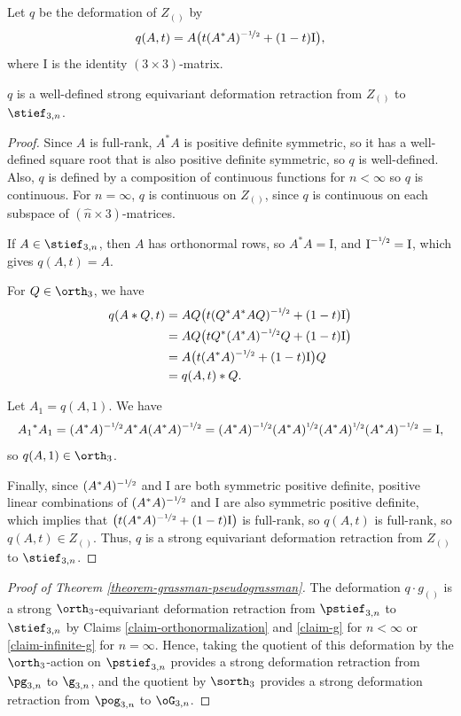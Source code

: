 \newcommand{\I}{\text{I}}

Let $q$ be the deformation of $Z_{()}$ by\vspace*{-3pt}
\[ q(A,t) = A \bigl(t(A^*A)^{-\nicefrac{1}{2}}+(1-t)\I\bigr), \]
where $\I$ is the identity $(3\times 3)$-matrix.

\begin{claim}\label{claim-orthonormalization}
$q$ is a well-defined strong equivariant deformation retraction from $Z_{()}$ to $\stief_{3,n}$.
\end{claim}

\begin{proof}
Since $A$ is full-rank, $A^*A$ is positive definite symmetric, so it has a well-defined square root that is also positive definite symmetric, so $q$ is well-defined. Also, $q$ is defined by a composition of continuous functions for $n < \infty$ so $q$ is continuous. For $n=\infty$, $q$ is continuous on $Z_{()}$, since $q$ is continuous on each subspace of $(\hat n\times 3)$-matrices.

If $A \in \stief_{3,n}$, then $A$ has orthonormal rows, so $A^*A = \I$, and $\I^{-\nicefrac{1}{2}} = \I$, which gives $q(A,t) = A$.

For $Q \in \orth_3$, we have\vspace*{-3pt}
\begin{align*}
q(A*Q,t)&= AQ \bigl(t(Q^*A^*AQ)^{-\nicefrac{1}{2}}+(1-t)\I \bigr) \\
&= AQ \bigl(tQ^*(A^*A)^{-\nicefrac{1}{2}}Q+(1-t)\I \bigr) \\
&= A \bigl(t(A^*A)^{-\nicefrac{1}{2}}+(1-t)\I \bigr) Q \\
&= q(A,t)*Q.
\end{align*}

Let $A_1 = q(A,1)$. We have
\[ A_1{}^* A_1
= (A^*A)^{-\nicefrac{1}{2}} A^* A (A^*A)^{-\nicefrac{1}{2}}
= (A^*A)^{-\nicefrac{1}{2}} (A^* A)^{\nicefrac{1}{2}} (A^* A)^{\nicefrac{1}{2}} (A^*A)^{-\nicefrac{1}{2}}
= \I, \]
so $q(A,1) \in \orth_3$.

Finally, since $(A^*A)^{-\nicefrac{1}{2}}$ and $\I$ are both symmetric positive definite, positive linear combinations of $(A^*A)^{-\nicefrac{1}{2}}$ and $\I$ are also symmetric positive definite, which implies that $\left(t(A^*A)^{-\nicefrac{1}{2}}+(1-t)\I\right)$ is full-rank, so $q(A,t)$ is full-rank, so $q(A,t) \in Z_{()}$.
Thus, $q$ is a strong equivariant deformation retraction from $Z_{()}$ to $\stief_{3,n}$.
\end{proof}

\begin{proof}[Proof of Theorem \ref{theorem-grassman-pseudograssman}]
The deformation $q \cdot g_{()}$ is a strong $\orth_3$-equivariant deformation retraction from $\pstief_{3,n}$ to $\stief_{3,n}$ by Claims \ref{claim-orthonormalization} and \ref{claim-g} for $n < \infty$ or \ref{claim-infinite-g} for $n = \infty$.
Hence, taking the quotient of this deformation by the $\orth_3$-action on $\pstief_{3,n}$ provides a strong deformation retraction from $\pg_{3,n}$ to $\g_{3,n}$, and the quotient by $\sorth_3$ provides a strong deformation retraction from $\pog_{3,n}$ to $\oG_{3,n}$.
\end{proof}

